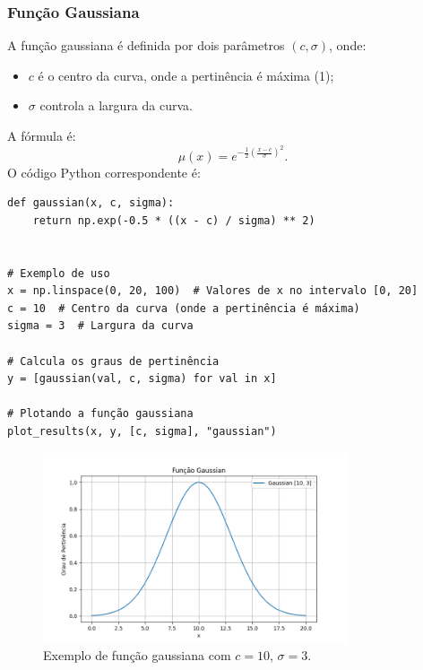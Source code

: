 \documentclass[a4paper,12pt]{article}
\begin{document}
\subsubsection{Função Gaussiana}
A função gaussiana é definida por dois parâmetros $(c, \sigma)$, onde:
\begin{itemize}
    \item $c$ é o centro da curva, onde a pertinência é máxima (1);
    \item $\sigma$ controla a largura da curva.
\end{itemize}
A fórmula é:
\[
\mu(x) = e^{-\frac{1}{2} \left( \frac{x - c}{\sigma} \right)^2}.
\]
O código Python correspondente é:
\begin{verbatim}
def gaussian(x, c, sigma):
    return np.exp(-0.5 * ((x - c) / sigma) ** 2)


# Exemplo de uso
x = np.linspace(0, 20, 100)  # Valores de x no intervalo [0, 20]
c = 10  # Centro da curva (onde a pertinência é máxima)
sigma = 3  # Largura da curva

# Calcula os graus de pertinência
y = [gaussian(val, c, sigma) for val in x]

# Plotando a função gaussiana
plot_results(x, y, [c, sigma], "gaussian")
\end{verbatim}
\begin{figure}[H]
    \centering
    \includegraphics[width=0.8\textwidth]{img/gaussian.png}
    \caption{Exemplo de função gaussiana com $c=10$, $\sigma=3$.}
\end{figure}
\end{document}
